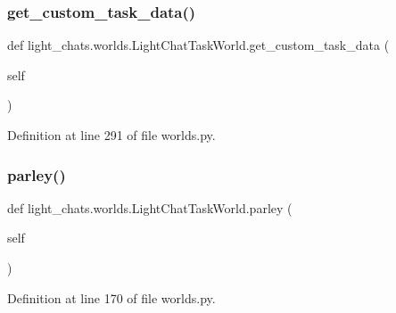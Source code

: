 \subsubsection{\texorpdfstring{get\+\_\+custom\+\_\+task\+\_\+data()}{get\_custom\_task\_data()}}
{\footnotesize\ttfamily def light\+\_\+chats.\+worlds.\+Light\+Chat\+Task\+World.\+get\+\_\+custom\+\_\+task\+\_\+data (\begin{DoxyParamCaption}\item[{}]{self }\end{DoxyParamCaption})}



Definition at line 291 of file worlds.\+py.

\mbox{\label{classlight__chats_1_1worlds_1_1LightChatTaskWorld_ab7abcdb2f6a25bd47ec17eb1e31e03cd}} 
\subsubsection{\texorpdfstring{parley()}{parley()}}
{\footnotesize\ttfamily def light\+\_\+chats.\+worlds.\+Light\+Chat\+Task\+World.\+parley (\begin{DoxyParamCaption}\item[{}]{self }\end{DoxyParamCaption})}



Definition at line 170 of file worlds.\+py.



